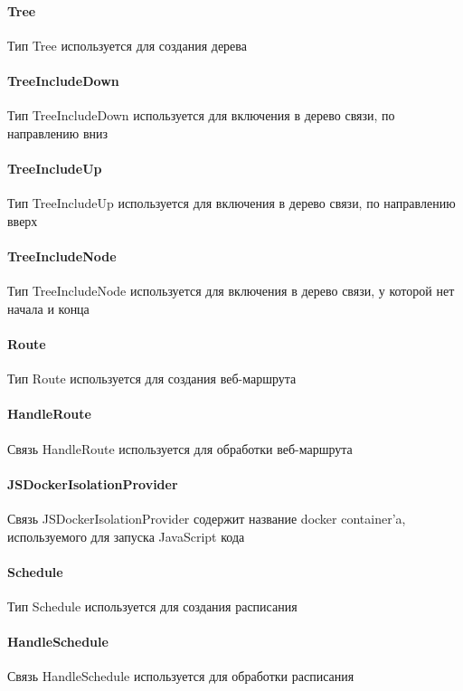 \documentclass{article}
\begin{document}
\paragraph*{Tree}\hypertarget{Core.Tree.Description}{}
Тип Tree используется для создания дерева
\paragraph*{TreeIncludeDown}\hypertarget{Core.TreeIncludeDown.Description}{}
Тип TreeIncludeDown используется для
включения в дерево связи, по направлению вниз
\paragraph*{TreeIncludeUp}\hypertarget{Core.TreeIncludeUp.Description}{}
Тип TreeIncludeUp используется для включения в
дерево связи, по направлению вверх
\paragraph*{TreeIncludeNode}\hypertarget{Core.TreeIncludeNode.Description}{}
Тип TreeIncludeNode используется для
включения в дерево связи, у которой нет начала и конца
\paragraph*{Route}\hypertarget{Core.Route.Description}{}
Тип Route используется для создания веб-маршрута
\paragraph*{HandleRoute}\hypertarget{Core.HandleRoute.Description}{}
Связь HandleRoute используется для обработки
веб-маршрута
\paragraph*{JSDockerIsolationProvider}\hypertarget{Core.JSDockerIsolationProvider.Description}{}
Связь JSDockerIsolationProvider содержит название docker container'a,
используемого для запуска JavaScript кода
\paragraph*{Schedule}\hypertarget{Core.Schedule.Description}{}
Тип Schedule используется для создания расписания
\paragraph*{HandleSchedule}\hypertarget{Core.HandleSchedule.Description}{}
Связь HandleSchedule используется для обработки расписания
\end{document}
